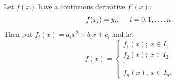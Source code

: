 \par 
Let $f(x)$ have a continuous derivative $f'(x)$:
\[
    f(x_i) = y_i; \hspace*{0.5cm} i = 0, 1, \ldots, n.  
\]
Then put $f_i(x) = a_i x^2 + b_i x + c_i$ and let 
\[
    f(x) = \left\{ \begin{array}{c}
        f_1(x); \ x \in I_1\\
        f_2(x); \ x \in I_2\\
        \vdots \\
        f_n(x); \ x \in I_n.
    \end{array}  \right.
\]
\begin{figure}
    \scalebox{1.2}{\begin{tikzpicture}[x=0.75pt,y=0.75pt,yscale=-1,xscale=1]
        

\end{tikzpicture}}
\end{figure}
